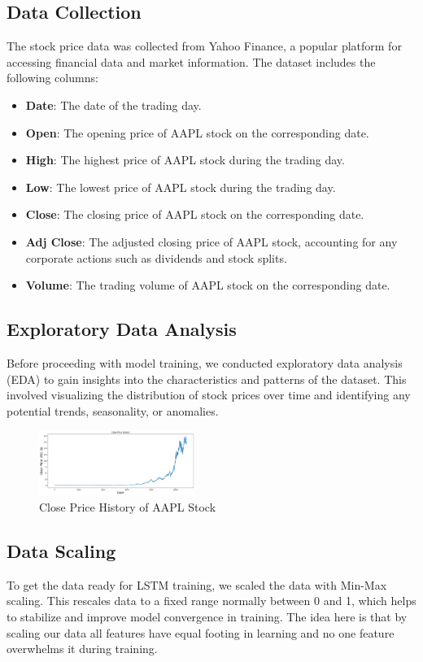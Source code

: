 \documentclass[10pt,twocolumn,letterpaper]{article}
\begin{document}
\subsection{Data Collection}
The stock price data was collected from Yahoo Finance, a popular platform for 
accessing financial data and market information. The dataset includes the following 
columns:
\begin{itemize}
    \item \textbf{Date}: The date of the trading day.
    \item \textbf{Open}: The opening price of AAPL stock on the corresponding date.
    \item \textbf{High}: The highest price of AAPL stock during the trading day.
    \item \textbf{Low}: The lowest price of AAPL stock during the trading day.
    \item \textbf{Close}: The closing price of AAPL stock on the corresponding date.
    \item \textbf{Adj Close}: The adjusted closing price of AAPL stock, accounting for any corporate actions such as dividends and stock splits.
    \item \textbf{Volume}: The trading volume of AAPL stock on the corresponding date.
\end{itemize}

\subsection{Exploratory Data Analysis}
Before proceeding with model training, we conducted exploratory data analysis (EDA) 
to gain insights into the characteristics and patterns of the dataset. This involved 
visualizing the distribution of stock prices over time and identifying any potential 
trends, seasonality, or anomalies.

\begin{figure}[H]
    \centering
    \includegraphics[width=0.45\textwidth]{close_price_history.png}
    \caption{Close Price History of AAPL Stock}
    \label{fig:close-price-history}
\end{figure}

\subsection{Data Scaling}
To get the data ready for LSTM training, we scaled the data with Min-Max scaling. 
This rescales data to a fixed range normally between 0 and 1, which helps to 
stabilize and improve model convergence in training. The idea here is that by 
scaling our data all features have equal footing in learning and no one feature 
overwhelms it during training.
\end{document}
